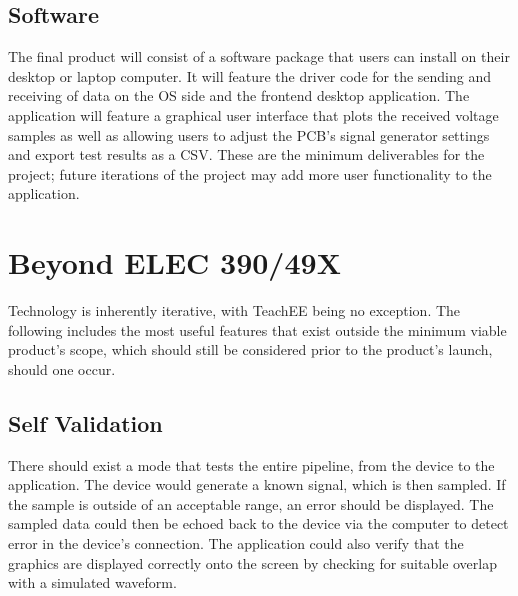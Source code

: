 \documentclass[letterpaper,12pt]{article}
\begin{document}
\subsection{Software} %
The final product will consist of a software package that users can install on
their desktop or laptop computer. It will feature the driver code for the
sending and receiving of data on the OS side and the frontend desktop
application. The application will feature a graphical user interface that plots
the received voltage samples as well as allowing users to adjust the PCB's
signal generator settings and export test results as a CSV. These are the
minimum deliverables for the project; future iterations of the project may add
more user functionality to the application.

\section{Beyond ELEC 390/49X} \label{sec:beyond} %


Technology is inherently iterative, with TeachEE being no exception. The
following includes the most useful features that exist outside the minimum
viable product's scope, which should still be considered prior to the product's
launch, should one occur.

\subsection{Self Validation}

There should exist a mode that tests the entire pipeline, from the device to the
application. The device would generate a known signal, which is then sampled. If
the sample is outside of an acceptable range, an error should be displayed. The
sampled data could then be echoed back to the device via the computer to detect
error in the device's connection. The application could also verify that the
graphics are displayed correctly onto the screen by checking for suitable
overlap with a simulated waveform.
\end{document}

